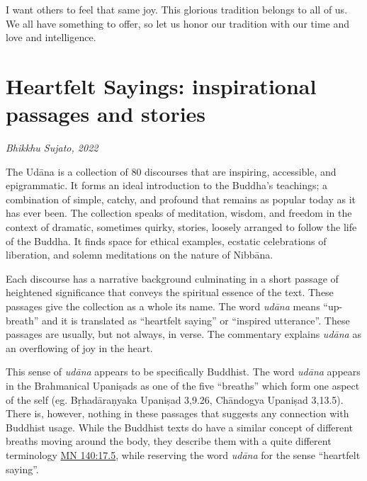\documentclass[12pt,openany]{book}%
\newcommand*{\scbyline}[1]{\begin{flushright}\textit{#1}\end{flushright}\bigskip}
\begin{document}
I want others to feel that same joy. This glorious tradition belongs to all of us. We all have something to offer, so let us honor our tradition with our time and love and intelligence.

%
\chapter*{Heartfelt Sayings: inspirational passages and stories}

\scbyline{Bhikkhu Sujato, 2022}

The \textsanskrit{Udāna} is a collection of 80 discourses that are inspiring, accessible, and epigrammatic. It forms an ideal introduction to the Buddha’s teachings; a combination of simple, catchy, and profound that remains as popular today as it has ever been. The collection speaks of meditation, wisdom, and freedom in the context of dramatic, sometimes quirky, stories, loosely arranged to follow the life of the Buddha. It finds space for ethical examples, ecstatic celebrations of liberation, and solemn meditations on the nature of \textsanskrit{Nibbāna}.

Each discourse has a narrative background culminating in a short passage of heightened significance that conveys the spiritual essence of the text. These passages give the collection as a whole its name. The word \textit{\textsanskrit{udāna}} means “up-breath” and it is translated as “heartfelt saying” or “inspired utterance”. These passages are usually, but not always, in verse. The commentary explains \textit{\textsanskrit{udāna}} as an overflowing of joy in the heart.

This sense of \textit{\textsanskrit{udāna}} appears to be specifically Buddhist. The word \textit{\textsanskrit{udāna}} appears in the Brahmanical \textsanskrit{Upaniṣads} as one of the five “breaths” which form one aspect of the self (eg. \textsanskrit{Bṛhadāraṇyaka} \textsanskrit{Upaniṣad} 3,9.26, \textsanskrit{Chāndogya} \textsanskrit{Upaniṣad} 3,13.5). There is, however, nothing in these passages that suggests any connection with Buddhist usage. While the Buddhist texts do have a similar concept of different breaths moving around the body, they describe them with a quite different terminology \href{https://suttacentral.net/mn140/en/sujato\#17.5}{MN 140:17.5}, while reserving the word \textit{\textsanskrit{udāna}} for the sense “heartfelt saying”.
\end{document}
